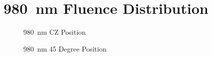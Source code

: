 \documentclass[journal,twoside,web]{ieeecolor}
\begin{document}
\section{980~nm Fluence Distribution}
\label{app:980Simulations}
\begin{figure}[htb!]
    \caption{\label{fig:980-CZ} 980~nm CZ Position}
\end{figure}

\begin{figure}[htb!]
    \caption{\label{fig:980-45} 980~nm 45 Degree Position}
\end{figure}
\end{document}
